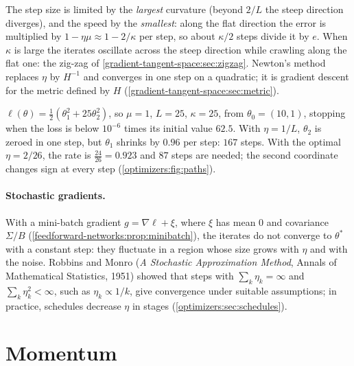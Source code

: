 \begin{notechapter}
The step size is limited by the \emph{largest} curvature (beyond $2/L$ the steep direction
diverges), and the speed by the \emph{smallest}: along the flat direction the error is
multiplied by $1 - \eta\mu\approx1 - 2/\kappa$ per step, so about $\kappa/2$ steps divide it by $e$. When $\kappa$ is large the
iterates oscillate across the steep direction while crawling along the flat one: the
zig-zag of \cref{gradient-tangent-space:sec:zigzag}. Newton's method replaces $\eta$ by $H^{-1}$ and
converges in one step on a quadratic; it is gradient descent for the metric defined by $H$
(\cref{gradient-tangent-space:sec:metric}).

\begin{example}\label{optimizers:ex:quadratic}
$\ell(\theta) = \frac12(\theta_1^2 + 25\theta_2^2)$, so $\mu = 1$, $L = 25$, $\kappa = 25$, from $\theta_0 = (10, 1)$, stopping when the loss is below $10^{-6}$
times its initial value $62.5$. With $\eta = 1/L$, $\theta_2$ is zeroed in one step, but $\theta_1$ shrinks by $0.96$ per
step: $167$ steps. With the optimal $\eta = 2/26$, the rate is $\frac{24}{26} = 0.923$ and $87$ steps are needed; the
second coordinate changes sign at every step (\cref{optimizers:fig:paths}).
\end{example}

\paragraph{Stochastic gradients.} With a mini-batch gradient $g = \nabla\ell + \xi$, where $\xi$ has mean $0$ and
covariance $\Sigma/B$ (\cref{feedforward-networks:prop:minibatch}), the iterates do not converge to $\theta^*$ with a
constant step: they fluctuate in a region whose size grows with $\eta$ and with the noise. Robbins
and Monro (\emph{A Stochastic Approximation Method}, Annals of Mathematical Statistics,
1951) showed that steps with $\sum_k\eta_k = \infty$ and $\sum_k\eta_k^2<\infty$, such as $\eta_k\propto1/k$, give convergence under suitable
assumptions; in practice, schedules decrease $\eta$ in stages (\cref{optimizers:sec:schedules}).

\section{Momentum}\label{optimizers:sec:momentum}


\end{notechapter}
